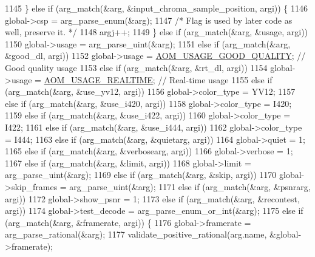 \begin{DoxyCodeInclude}
{{{{{{{{{{{{{{1145     \} \textcolor{keywordflow}{else} \textcolor{keywordflow}{if} (arg\_match(&arg, &input\_chroma\_sample\_position, argi)) \{
1146       global->csp = arg\_parse\_enum(&arg);
1147       \textcolor{comment}{/* Flag is used by later code as well, preserve it. */}
1148       argj++;
1149     \} \textcolor{keywordflow}{else} \textcolor{keywordflow}{if} (arg\_match(&arg, &usage, argi))
1150       global->usage = arg\_parse\_uint(&arg);
1151     \textcolor{keywordflow}{else} \textcolor{keywordflow}{if} (arg\_match(&arg, &good\_dl, argi))
1152       global->usage = \hyperlink{group__encoder_ga03ca3defc61e1d70c34e9d94e7cee823}{AOM\_USAGE\_GOOD\_QUALITY};  \textcolor{comment}{// Good quality usage}
1153     \textcolor{keywordflow}{else} \textcolor{keywordflow}{if} (arg\_match(&arg, &rt\_dl, argi))
1154       global->usage = \hyperlink{group__encoder_gae2cc24d3083099df8eb60ad65f81c62f}{AOM\_USAGE\_REALTIME};  \textcolor{comment}{// Real-time usage}
1155     \textcolor{keywordflow}{else} \textcolor{keywordflow}{if} (arg\_match(&arg, &use\_yv12, argi))
1156       global->color\_type = YV12;
1157     \textcolor{keywordflow}{else} \textcolor{keywordflow}{if} (arg\_match(&arg, &use\_i420, argi))
1158       global->color\_type = I420;
1159     \textcolor{keywordflow}{else} \textcolor{keywordflow}{if} (arg\_match(&arg, &use\_i422, argi))
1160       global->color\_type = I422;
1161     \textcolor{keywordflow}{else} \textcolor{keywordflow}{if} (arg\_match(&arg, &use\_i444, argi))
1162       global->color\_type = I444;
1163     \textcolor{keywordflow}{else} \textcolor{keywordflow}{if} (arg\_match(&arg, &quietarg, argi))
1164       global->quiet = 1;
1165     \textcolor{keywordflow}{else} \textcolor{keywordflow}{if} (arg\_match(&arg, &verbosearg, argi))
1166       global->verbose = 1;
1167     \textcolor{keywordflow}{else} \textcolor{keywordflow}{if} (arg\_match(&arg, &limit, argi))
1168       global->limit = arg\_parse\_uint(&arg);
1169     \textcolor{keywordflow}{else} \textcolor{keywordflow}{if} (arg\_match(&arg, &skip, argi))
1170       global->skip\_frames = arg\_parse\_uint(&arg);
1171     \textcolor{keywordflow}{else} \textcolor{keywordflow}{if} (arg\_match(&arg, &psnrarg, argi))
1172       global->show\_psnr = 1;
1173     \textcolor{keywordflow}{else} \textcolor{keywordflow}{if} (arg\_match(&arg, &recontest, argi))
1174       global->test\_decode = arg\_parse\_enum\_or\_int(&arg);
1175     \textcolor{keywordflow}{else} \textcolor{keywordflow}{if} (arg\_match(&arg, &framerate, argi)) \{
1176       global->framerate = arg\_parse\_rational(&arg);
1177       validate\_positive\_rational(arg.name, &global->framerate);
}}}}}}}}}}}}}}
\end{DoxyCodeInclude}
